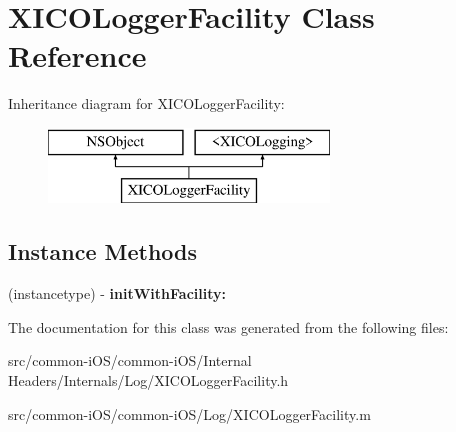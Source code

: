 \hypertarget{interface_x_i_c_o_logger_facility}{}\section{X\+I\+C\+O\+Logger\+Facility Class Reference}
\label{interface_x_i_c_o_logger_facility}
Inheritance diagram for X\+I\+C\+O\+Logger\+Facility\+:\begin{figure}[H]
\begin{center}
\leavevmode
\includegraphics[height=2.000000cm]{interface_x_i_c_o_logger_facility}
\end{center}
\end{figure}
\subsection*{Instance Methods}
\begin{DoxyCompactItemize}
\item 
\hypertarget{interface_x_i_c_o_logger_facility_ae3846b2c0bb4dbbaf53493e818fe5781}{}\label{interface_x_i_c_o_logger_facility_ae3846b2c0bb4dbbaf53493e818fe5781} 
(instancetype) -\/ {\bfseries init\+With\+Facility\+:}
\end{DoxyCompactItemize}


The documentation for this class was generated from the following files\+:\begin{DoxyCompactItemize}
\item 
src/common-\/i\+O\+S/common-\/i\+O\+S/\+Internal Headers/\+Internals/\+Log/X\+I\+C\+O\+Logger\+Facility.\+h\item 
src/common-\/i\+O\+S/common-\/i\+O\+S/\+Log/X\+I\+C\+O\+Logger\+Facility.\+m\end{DoxyCompactItemize}
